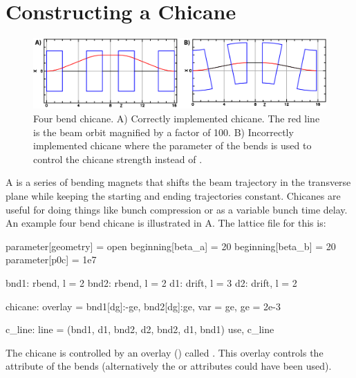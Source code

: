 \documentclass{hitec}     %
\newcommand{\Section}[1]{\section{#1}\vspace*{-1ex}}
\begin{document}
\Section{Constructing a Chicane}
\label{s:chicane}

\begin{figure}[tb]
  \centering
  \includegraphics[width=5in]{chicane.pdf}
  \caption[Four bend chicane.]{Four bend chicane. A) Correctly implemented chicane. The red line is 
the beam orbit magnified by a factor of 100. B) Incorrectly implemented chicane where the 
parameter of the bends is used to control the chicane strength instead of .
  }
  \label{f:chicane}
\end{figure}

A  is a series of bending magnets that shifts the beam trajectory in the transverse
plane while keeping the starting and ending trajectories constant. Chicanes are useful for doing
things like bunch compression or as a variable bunch time delay. An example four bend chicane is
illustrated in A. The lattice file for this is:
\begin{code}
  parameter[geometry] = open
  beginning[beta_a] = 20
  beginning[beta_b] = 20
  parameter[p0c] = 1e7

  bnd1: rbend, l = 2
  bnd2: rbend, l = 2
  d1: drift, l = 3
  d2: drift, l = 2

  chicane: overlay = {bnd1[dg]:-ge, bnd2[dg]:ge}, var = {ge}, ge = 2e-3

  c_line: line = (bnd1, d1, bnd2, d2, bnd2, d1, bnd1)
  use, c_line
\end{code}
The chicane is controlled by an overlay () called . This overlay controls
the  attribute of the bends (alternatively the  or  attributes could have
been used).
\end{document}
